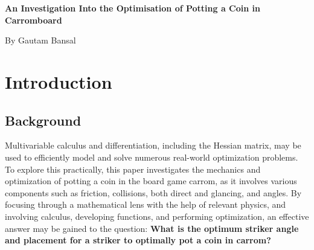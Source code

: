 \documentclass[10pt]{article}
\begin{document}
\begin{titlepage}
    \centering
    \vspace*{\fill}
    
    {\Large \textbf{An Investigation Into the Optimisation of Potting a Coin in Carromboard}}

    \vspace{2cm}
    
    {\Large By Gautam Bansal}
    
    \vspace{2cm}
    
    \begin{abstract}
    \noindent This investigation explores how direct and glancing collisions in the board game carrom can be
mathematically modelled to find the optimum striker angle and placement to pot a coin. To achieve
this, two methods are developed. First, a purely geometric function is found that evaluates angular deviation by assuming fully elastic collisions and ignoring friction. With numerical
partial differentiation and Hessian matrices, this model is mathematically optimised to find critical
points that represent the best possible striker shots with zero angular deviation. Then, a kinematic function that considers friction, initial velocity, and masses is derived to accurately calculate the coin’s
final stopping distance to the pot. This physics-based approach is then numerically optimised through by programatically generating comprehensive heatmaps showing coin “pottability”
across the board. Together, these methods demonstrate how differentiatial calculus can balance mathematical complexity with tractability, effectively optimizing real-world strategies.
    \end{abstract}
    
    \vspace*{\fill}
\end{titlepage}

\pagebreak
\tableofcontents
\pagebreak

\setcounter{page}{1}
\section{Introduction}
       
\subsection{Background}
Multivariable calculus and differentiation, including the Hessian matrix, may be used to efficiently model and solve numerous real-world optimization problems. To explore this practically, this paper investigates the mechanics and optimization of potting a coin in the board game carrom, as it involves various components such as friction, collisions, both direct and glancing, and angles. By focusing through a mathematical lens with the help of relevant physics, and involving calculus, developing functions, and performing optimization, an effective answer may be gained to the question: \textbf{What is the optimum striker angle and placement for a striker to optimally pot a coin in carrom?}
\end{document}

